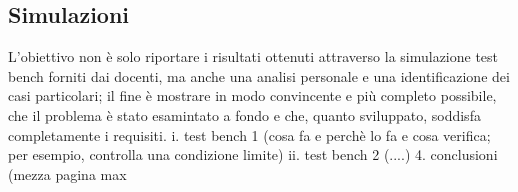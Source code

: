 \documentclass[11pt, a4paper]{article}
\begin{document}
    \subsection{Simulazioni}
    \label{subsec:sim}
        L'obiettivo non è solo riportare i risultati ottenuti attraverso la
    simulazione test bench forniti dai docenti, ma anche una analisi personale e
    una identificazione dei casi particolari; il fine è mostrare in modo convincente
    e più completo possibile, che il problema è stato esamintato a fondo e che,
    quanto sviluppato, soddisfa completamente i requisiti.
    i. test bench 1 (cosa fa e perchè lo fa e cosa verifica; per esempio,
    controlla una condizione limite)
    ii. test bench 2 (....)
    4. conclusioni (mezza pagina max
\end{document}
